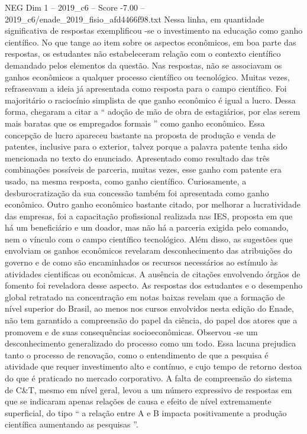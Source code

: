 \begin{textsample}{NEG Dim 1 – 2019\_c6 – Score -7.00 – 2019\_c6/enade\_2019\_fisio\_afd4466f98.txt}
Nessa linha, em quantidade significativa de respostas exemplificou -se o investimento na educação como ganho científico.
No que tange ao item sobre os aspectos econômicos, em boa parte das respostas, os estudantes não estabeleceram relação com o contexto científico demandado pelos elementos da questão.
Nas respostas, não se associavam os ganhos econômicos a qualquer processo científico ou tecnológico.
Muitas vezes, refraseavam a ideia já apresentada como resposta para o campo científico.
Foi majoritário o raciocínio simplista de que ganho econômico é igual a lucro.
Dessa forma, chegaram a citar a “ adoção de mão de obra de estagiários, por elas serem mais baratas que os empregados formais ” como ganho econômico.
Essa concepção de lucro apareceu bastante na proposta de produção e venda de patentes, inclusive para o exterior, talvez porque a palavra patente tenha sido mencionada no texto do enunciado.
Apresentado como resultado das três combinações possíveis de parceria, muitas vezes, esse ganho com patente era usado, na mesma resposta, como ganho científico.
Curiosamente, a desburocratização da sua concessão também foi apresentada como ganho econômico.
Outro ganho econômico bastante citado, por melhorar a lucratividade das empresas, foi a capacitação profissional realizada nas IES, proposta em que há um beneficiário e um doador, mas não há a parceria exigida pelo comando, nem o vínculo com o campo científico tecnológico.
Além disso, as sugestões que envolviam os ganhos econômicos revelaram desconhecimento das atribuições do governo e de como são encaminhados os recursos necessários ao estímulo às atividades cientificas ou econômicas.
A ausência de citações envolvendo órgãos de fomento foi reveladora desse aspecto.
As respostas dos estudantes e o desempenho global retratado na concentração em notas baixas revelam que a formação de nível superior do Brasil, ao menos nos cursos envolvidos nesta edição do Enade, não tem garantido a compreensão do papel da ciência, do papel dos atores que a promovem e de suas consequências socioeconômicas.
Observou -se um desconhecimento generalizado do processo como um todo.
Essa lacuna prejudica tanto o processo de renovação, como o entendimento de que a pesquisa é atividade que requer investimento alto e contínuo, e cujo tempo de retorno destoa do que é praticado no mercado corporativo.
A falta de compreensão do sistema de C\&T, mesmo em nível geral, levou a um número expressivo de respostas em que se indicaram apenas relações de causa e efeito de nível extremamente superficial, do tipo “ a relação entre A e B impacta positivamente a produção científica aumentando as pesquisas ”.

\end{textsample}
